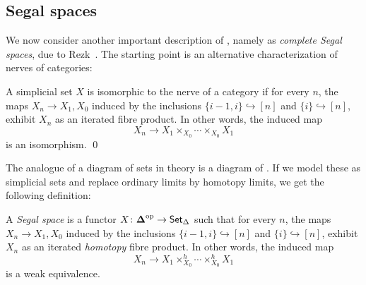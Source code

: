 \documentclass[a4paper,11pt]{article}
\begin{document}
\subsection{Segal spaces}\label{subsec:segsp}
We now consider another important description of \icats{}, namely as
\emph{complete Segal spaces}, due to Rezk~\cite{RezkCSS}. The starting point is an alternative
characterization of nerves of categories:
\begin{propn}
  A simplicial set $X$ is isomorphic to the nerve of a category if
  for every $n$, the maps $X_{n} \to X_{1}, X_{0}$ induced by
  the inclusions $\{i-1,i\} \hookrightarrow [n]$ and
  $\{i\} \hookrightarrow [n]$, exhibit $X_{n}$ as an iterated fibre
  product.  In other words, the induced map
  \[ X_{n} \to X_{1} \times_{X_{0}} \cdots \times_{X_{0}} X_{1}\] is
  an isomorphism. \qed
\end{propn}
The analogue of a diagram of sets in \icat{} theory is a diagram of
\igpds{}. If we model these as simplicial sets and replace ordinary
limits by homotopy limits, we get the following definition:
\begin{defn}
  A \emph{Segal space} is a functor $X \colon \Dop \to \sSet$ such
  that for every $n$, the maps $X_{n} \to X_{1}, X_{0}$ induced by the
  inclusions $\{i-1,i\} \hookrightarrow [n]$ and
  $\{i\} \hookrightarrow [n]$, exhibit $X_{n}$ as an iterated
  \emph{homotopy} fibre
  product.  In other words, the induced map
  \[ X_{n} \to X_{1} \times^{h}_{X_{0}} \cdots \times^{h}_{X_{0}}
    X_{1}\] is a weak equivalence.
\end{defn}
\end{document}
